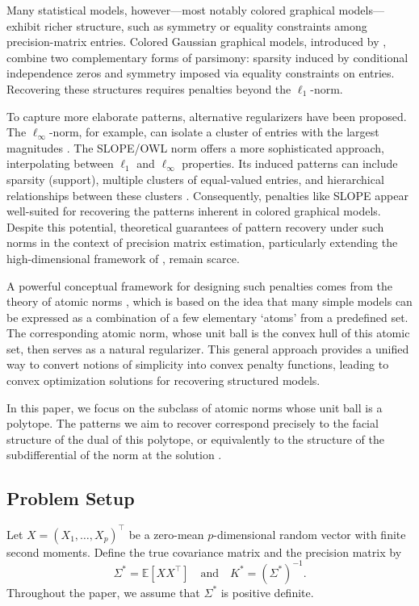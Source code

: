 \documentclass[12pt]{amsart}
\numberwithin{equation}{section}
\numberwithin{equation}{section}
\theoremstyle{definition}
\newcommand{\E}{\mathbb{E}}
\begin{document}
Many statistical models, however---most notably colored graphical models---exhibit richer structure, such as symmetry or equality constraints among precision-matrix entries. Colored Gaussian graphical models, introduced by \citet{HL08}, combine two complementary forms of parsimony: sparsity induced by conditional independence zeros and symmetry imposed via equality constraints on entries. Recovering these structures requires penalties beyond the $\ell_1$-norm.


To capture more elaborate patterns, alternative regularizers have been proposed. The $\ell_\infty$-norm, for example, can isolate a cluster of entries with the largest magnitudes \citep{ellinfty}. The SLOPE/OWL norm \citep{Negrinho, bogdan2015slope, figueiredo16} offers a more sophisticated approach, interpolating between $\ell_1$ and $\ell_\infty$ properties. Its induced patterns can include sparsity (support), multiple clusters of equal-valued entries, and hierarchical relationships between these clusters \citep{schneider2020geometry,7aut}. Consequently, penalties like SLOPE appear well-suited for recovering the patterns inherent in colored graphical models. Despite this potential, theoretical guarantees of pattern recovery under such norms in the context of precision matrix estimation, particularly extending the high-dimensional framework of \citet{Meinshausen2006,Rothman08, Sparsistency,ravikumar2011graphical}, remain scarce. 


A powerful conceptual framework for designing such penalties comes from the theory of atomic norms \citep{Chandra12}, which is based on the idea that many simple models can be expressed as a combination of a few elementary `atoms' from a predefined set. The corresponding atomic norm, whose unit ball is the convex hull of this atomic set, then serves as a natural regularizer. This general approach provides a unified way to convert notions of simplicity into convex penalty functions, leading to convex optimization solutions for recovering structured models.  			


In this paper, we focus on the subclass of atomic norms whose unit ball is a polytope.
The patterns we aim to recover correspond precisely to the facial structure of the dual of this polytope, or equivalently to the structure of the subdifferential of the norm at the solution \citep{POLYNORMS}.
\subsection{Problem Setup}
Let $X=(X_1,\ldots,X_p)^\top$ be a zero-mean $p$-dimensional random vector with finite second moments. Define the true covariance matrix and the precision matrix by
\[
\Sigma^\ast=\E[X X^\top]\quad\mbox{and}\quad K^\ast=(\Sigma^\ast)^{-1}.
\]
Throughout the paper, we assume that $\Sigma^\ast$ is positive definite.
\end{document}
